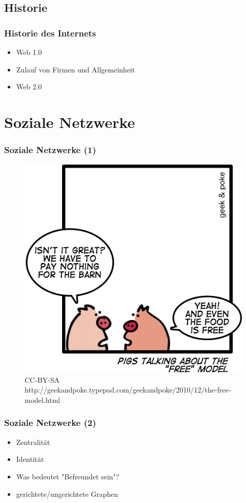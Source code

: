 \documentclass{beamer}
\begin{document}
\subsection{Historie}

\begin{frame}
  \frametitle{Historie des Internets}
  \begin{itemize}
    \item<1-> Web 1.0
    \item<2-> Zulauf von Firmen und Allgemeinheit
    \item<3-> Web 2.0
  \end{itemize}
\end{frame}

\section{Soziale Netzwerke}

\begin{frame}
  \frametitle{Soziale Netzwerke (1)}
  \begin{figure}
    \includegraphics[height=0.6\textheight]{img/business_pigs.jpg}
    \caption{CC-BY-SA http://geekandpoke.typepad.com/geekandpoke/2010/12/the-free-model.html}
  \end{figure}
\end{frame}

\begin{frame}
  \frametitle{Soziale Netzwerke (2)}
  \begin{itemize}
    \item<1-> Zentralität
    \item<2-> Identität
    \item<3-> Was bedeutet "Befreundet sein"?
    \item<4-> gerichtete/ungerichtete Graphen
  \end{itemize}
\end{frame}
\end{document}
